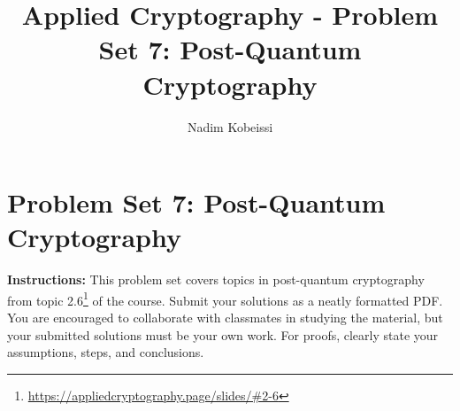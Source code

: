 \documentclass[10pt,a4paper,american]{exam}
\title{Applied Cryptography - Problem Set 7: Post-Quantum Cryptography}
\author{Nadim Kobeissi}
\begin{document}
\classhandoutheader
\section*{Problem Set 7: Post-Quantum Cryptography}

\begin{tcolorbox}[colframe=OliveGreen!30!white,colback=OliveGreen!5!white]
	\textbf{Instructions:} This problem set covers topics in post-quantum cryptography from topic 2.6\footnote{\url{https://appliedcryptography.page/slides/\#2-6}} of the course. Submit your solutions as a neatly formatted PDF. You are encouraged to collaborate with classmates in studying the material, but your submitted solutions must be your own work. For proofs, clearly state your assumptions, steps, and conclusions.
\end{tcolorbox}
\end{document}
